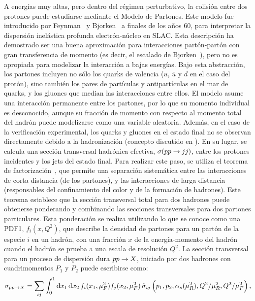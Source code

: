 A energías muy altas, pero dentro del régimen perturbativo, la colisión entre dos protones puede estudiarse mediante el Modelo de Partones. Este modelo fue introducido por Feynman~\cite{Feynman-1969} y Bjorken~\cite{Bjorken-1969_1} a finales de los años 60, para interpretar la dispersión inelástica profunda electrón-núcleo en SLAC. Esta descripción ha demostrado ser una buena aproximación para interacciones partón-partón con gran transferencia de momento (es decir, el escalado de Bjorken~\cite{Bjorken-1969_2}), pero no es apropiada para modelizar la interacción a bajas energías.
Bajo esta abstracción, los partones incluyen no sólo los quarks de valencia (\(u\), \(\bar{u}\) y \(d\) en el caso del protón), sino también los pares de partículas y antipartículas en el mar de quarks, y los gluones que median las interacciones entre ellos. El modelo asume una interacción permanente entre los partones, por lo que su momento individual es desconocido, aunque su fracción de momento con respecto al momento total del hadrón puede modelizarse como una variable aleatoria.
Además, en el caso de la verificación experimental, los quarks y gluones en el estado final no se observan directamente debido a la hadronización (concepto discutido en \Sect{\ref{subsec:theory:mc_simulation:hadronisation}}). En su lugar, se calcula una sección transversal hadrónica efectiva, \(\sigma(pp\rightarrow jj)\), entre los protones incidentes y los jets del estado final. Para realizar este paso, se utiliza el teorema de factorización~\cite{Ellis_Georgi_Politzer_Ross-1978,Feynman-1969,Collins_Soper_Sterman-book,Collins_Soper-1987}, que permite una separación sistemática entre las interacciones de corta distancia (de los partones), y las interacciones de larga distancia (responsables del confinamiento del color y de la formación de hadrones). Este teorema establece que la sección transversal total para dos hadrones puede obtenerse ponderando y combinando las secciones transversales para dos partones particulares. Esta ponderación se realiza utilizando lo que se conoce como una \ac{PDF1}, \(f_i(x,Q^2)\), que describe la densidad de partones para un part\'on de la especie \(i\) en un hadrón, con una fracción \(x\) de la energía-momento del hadrón cuando el hadrón se prueba a una escala de resolución \(Q^2\). La sección transversal para un proceso de dispersión dura \(pp \rightarrow X\), iniciado por dos hadrones con cuadrimomentos \(P_1\) y \(P_2\) puede escribirse como:
\begin{equation}
    \label{eq:theory:sm:hadron_interactions:xs}
    \sigma_{pp\rightarrow X} = \sum_{ij} \int_0^1 \dd{x_1} \dd{x_2} f_i(x_1, \mu_F^2) f_j(x_2, \mu_F^2) \, \hat{\sigma}_{ij}\left(p_1, p_2, \alpha_s(\mu_R^2), Q^2/\mu_R^2, Q^2/\mu_F^2 \right),
\end{equation}
